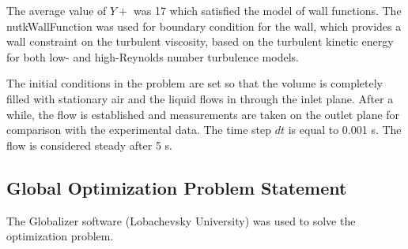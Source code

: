 \documentclass[mathematics,article,accept,pdftex,moreauthors]{Definitions/mdpi}
\begin{document}
The average value of $Y+$ was 17 which satisfied the model of wall functions. The nutkWallFunction was used for boundary condition for the wall, which provides a wall constraint on the turbulent viscosity, based on the turbulent kinetic energy for both low- and high-Reynolds number turbulence models.


The initial conditions in the problem are set so that the volume is completely filled with stationary air and the liquid flows in through the inlet plane. After a while, the flow is established and measurements are taken on the outlet plane for comparison with the experimental data. The time step $dt$ is equal to 0.001 s. The flow is considered steady after 5 s.















\subsection{Global Optimization Problem Statement}
The Globalizer software (Lobachevsky University) was used to solve the optimization problem.
\end{document}
